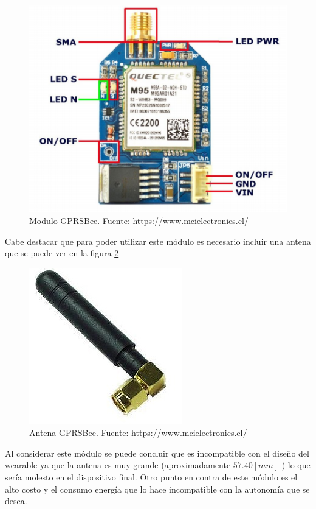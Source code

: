 \begin{figure}[H]
	\centering
	\includegraphics[scale=0.8]{figuras/com/gprs.png}
	\caption{Modulo GPRSBee. Fuente: https://www.mcielectronics.cl/}
	\label{gprs}
\end{figure}

Cabe destacar que para poder utilizar este módulo es necesario incluir una antena que se puede ver en la figura \ref{antena}

\begin{figure}[H]
	\centering
	\includegraphics[scale=0.5]{figuras/com/antena.jpg}
	\caption{Antena GPRSBee. Fuente: https://www.mcielectronics.cl/}
	\label{antena}
\end{figure}

Al considerar este módulo se puede concluir que es incompatible con el diseño del wearable ya que la antena es muy grande (aproximadamente $57.40[mm]$ ) lo que sería molesto en el dispositivo final. Otro punto en contra de este módulo es el alto costo y el consumo energía que lo hace incompatible con la autonomía que se desea.


